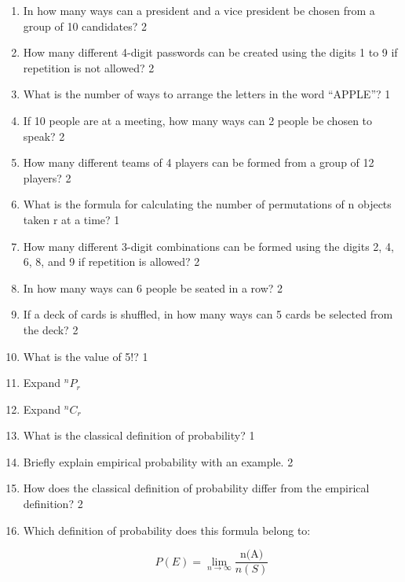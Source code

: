\documentclass[a4paper,oneside, margin=1.4in]{book}
\begin{document}
\begin{enumerate}
\item In how many ways can a president and a vice president be chosen from a group of 10 candidates? \hfill 2

\item How many different 4-digit passwords can be created using the digits 1 to 9 if repetition is not allowed? \hfill 2

\item What is the number of ways to arrange the letters in the word “APPLE”? \hfill 1

\item If 10 people are at a meeting, how many ways can 2 people be chosen to speak? \hfill 2

\item How many different teams of 4 players can be formed from a group of 12 players? \hfill 2

\item What is the formula for calculating the number of permutations of n objects taken r at a time? \hfill 1

\item How many different 3-digit combinations can be formed using the digits 2, 4, 6, 8, and 9 if repetition is allowed? \hfill 2

\item In how many ways can 6 people be seated in a row? \hfill 2

\item If a deck of cards is shuffled, in how many ways can 5 cards be selected from the deck? \hfill 2

\item What is the value of 5!? \hfill 1

\item Expand ${}^nP_r$

\item Expand ${}^nC_r$

\item What is the classical definition of probability? \hfill 1

\item Briefly explain empirical probability with an example. \hfill 2

\item How does the classical definition of probability differ from the empirical definition? \hfill 2

\item Which definition of probability does this formula belong to: 

\[
P(E) = \lim_{n \to \infty} \frac{\text{n(A)}}{n(S)}
\]


\end{enumerate}
\end{document}

